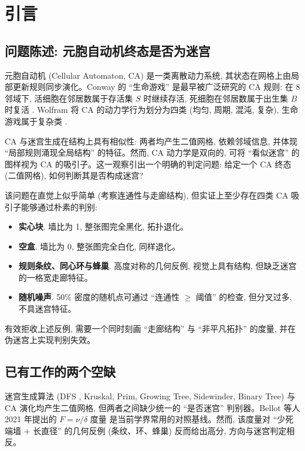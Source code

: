 
\section{引言}
\label{sec:intro}

\subsection{问题陈述: 元胞自动机终态是否为迷宫}

元胞自动机 (Cellular Automaton, CA) 是一类离散动力系统, 其状态在网格上由局部更新规则同步演化。Conway 的 ``生命游戏'' 是最早被广泛研究的 CA 规则: 在 8 邻域下, 活细胞在邻居数属于存活集 $S$ 时继续存活, 死细胞在邻居数属于出生集 $B$ 时复活 \cite{conway1970}. Wolfram 将 CA 的动力学行为划分为四类 (均匀, 周期, 混沌, 复杂), 生命游戏属于复杂类 \cite{wolfram2002}.

CA 与迷宫生成在结构上具有相似性: 两者均产生二值网格, 依赖邻域信息, 并体现 ``局部规则涌现全局结构'' 的特征。然而, CA 动力学是双向的, 可将 ``看似迷宫'' 的图样视为 CA 的吸引子。这一观察引出一个明确的判定问题: 给定一个 CA 终态 (二值网格), 如何判断其是否构成迷宫?

该问题在直觉上似乎简单 (考察连通性与走廊结构), 但实证上至少存在四类 CA 吸引子能够通过朴素的判别:
\begin{itemize}[leftmargin=*, itemsep=0pt, topsep=0pt]
  \item \textbf{实心块}. 墙比为 1, 整张图完全黑化, 拓扑退化。
  \item \textbf{空盒}. 墙比为 0, 整张图完全白化, 同样退化。
  \item \textbf{规则条纹、同心环与蜂巢}. 高度对称的几何反例, 视觉上具有结构, 但缺乏迷宫的一格宽走廊特征。
  \item \textbf{随机噪声}. 50\% 密度的随机点可通过 ``连通性 $\ge$ 阈值'' 的检查, 但分叉过多, 不具迷宫特征。
\end{itemize}

有效拒收上述反例, 需要一个同时刻画 ``走廊结构'' 与 ``非平凡拓扑'' 的度量, 并在伪迷宫上实现判别失效。

\subsection{已有工作的两个空缺}

迷宫生成算法 (DFS \cite{pech2002}, Kruskal, Prim, Growing Tree, Sidewinder, Binary Tree) 与 CA 演化均产生二值网格, 但两者之间缺少统一的 ``是否迷宫'' 判别器。Bellot 等人 2021 年提出的 $F = \nu / \delta$ 度量 \cite{bellot2021} 是当前学界常用的对照基线。然而, 该度量对 ``少死端墙 + 长直径'' 的几何反例 (条纹、环、蜂巢) 反而给出高分, 方向与迷宫判定相反。


